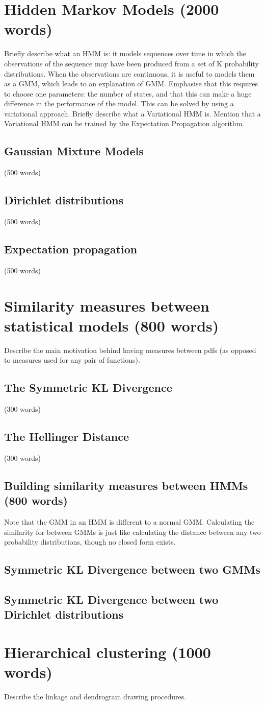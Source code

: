 \documentclass[../main.tex]{subfiles}
\begin{document}
\section{ Hidden Markov Models (2000 words)} \label{section_hmm}
Briefly describe what an HMM is: it models sequences over time in which the observations of the sequence may have been produced from a set of K probability distributions. When the observations are continuous, it is useful to models them as a GMM, which leads to an explanation of GMM. Emphasise that this requires to choose one parameters: the number of states, and that this can make a huge difference in the performance of the model. This can be solved by using a variational approach. Briefly describe what a Variational HMM is. Mention that  a Variational HMM can be trained by the Expectation Propagation algorithm.
\subsection{ Gaussian Mixture Models } (500 words) 
\subsection{ Dirichlet distributions } (500 words) 
\subsection{ Expectation propagation } (500 words) 

\section{ Similarity measures between statistical models (800 words)} \label{section_similarity}
Describe the main motivation behind having measures between pdfs (as opposed to measures used for any pair of functions).
\subsection{The Symmetric KL Divergence} (300 words)
\subsection{The Hellinger Distance} (300 words)
\subsection{ Building similarity measures between HMMs (800 words) } 
Note that the GMM in an HMM is different to a normal GMM. Calculating the similarity for between GMMs is just like calculating the distance between any two probability distributions, though no closed form exists. 
\subsection{Symmetric KL Divergence between two GMMs}
\subsection{Symmetric KL Divergence between two Dirichlet distributions}

\section{ Hierarchical clustering (1000 words)} \label{section_hierarchical}
Describe the linkage and dendrogram drawing procedures.
\end{document}
